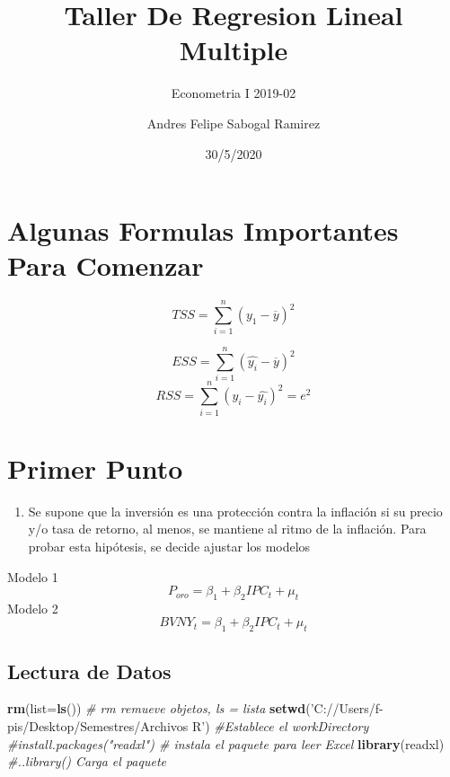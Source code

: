 \documentclass[
]{article}
\title{Taller De Regresion Lineal Multiple}
\subtitle{Econometria I 2019-02}
\author{Andres Felipe Sabogal Ramirez}
\date{30/5/2020}
\newenvironment{Shaded}{\begin{snugshade}}{\end{snugshade}}
\newcommand{\CommentTok}[1]{\textcolor[rgb]{0.56,0.35,0.01}{\textit{#1}}}
\newcommand{\DataTypeTok}[1]{\textcolor[rgb]{0.13,0.29,0.53}{#1}}
\newcommand{\KeywordTok}[1]{\textcolor[rgb]{0.13,0.29,0.53}{\textbf{#1}}}
\newcommand{\NormalTok}[1]{#1}
\newcommand{\StringTok}[1]{\textcolor[rgb]{0.31,0.60,0.02}{#1}}
\providecommand{\tightlist}{%
  \setlength{\itemsep}{0pt}\setlength{\parskip}{0pt}}
\begin{document}
\maketitle

\hypertarget{algunas-formulas-importantes-para-comenzar}{%
\section{Algunas Formulas Importantes Para
Comenzar}\label{algunas-formulas-importantes-para-comenzar}}

\[TSS=\sum_{i=1}^{n}(y_1-\overline{y})^2\]

\[ESS=\sum_{i=1}^{n}(\hat{y_i}-\overline{y})^2\]
\[RSS=\sum_{i=1}^{n}(y_i-\hat{y_i})^2=e^2\]

\hypertarget{primer-punto}{%
\section{Primer Punto}\label{primer-punto}}

\begin{enumerate}
\def\labelenumi{\arabic{enumi}.}
\tightlist
\item
  Se supone que la inversión es una protección contra la inflación si su
  precio y/o tasa de retorno, al menos, se mantiene al ritmo de la
  inflación. Para probar esta hipótesis, se decide ajustar los modelos
\end{enumerate}

Modelo 1 \[P_{oro}=\beta_1+\beta_2IPC_t+\mu_t\] Modelo 2
\[BVNY_{t}=\beta_1+\beta_2IPC_t+\mu_t\]

\hypertarget{lectura-de-datos}{%
\subsection{Lectura de Datos}\label{lectura-de-datos}}

\begin{Shaded}
\begin{Highlighting}[]
\KeywordTok{rm}\NormalTok{(}\DataTypeTok{list=}\KeywordTok{ls}\NormalTok{()) }\CommentTok{# rm remueve objetos, ls = lista}
\KeywordTok{setwd}\NormalTok{(}\StringTok{'C://Users/f-pis/Desktop/Semestres/Archivos R'}\NormalTok{) }\CommentTok{#Establece el workDirectory}
\CommentTok{#install.packages("readxl") # instala el paquete para leer Excel }
\KeywordTok{library}\NormalTok{(readxl) }\CommentTok{#..library() Carga el paquete }
\end{Highlighting}
\end{Shaded}
\end{document}

